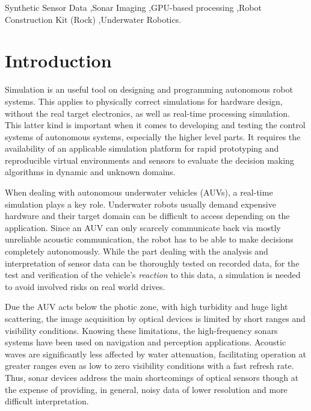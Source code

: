 \documentclass[final,5p,times]{elsarticle}
\begin{document}
\begin{frontmatter}
\begin{abstract}
\end{abstract}

\begin{keyword}
Synthetic Sensor Data \sep Sonar Imaging  \sep GPU-based processing \sep Robot Construction Kit (Rock) \sep Underwater Robotics.

\end{keyword}

\end{frontmatter}

\linenumbers

\section{Introduction}
\label{introduction}

Simulation is an useful tool on designing and programming autonomous robot systems. This applies to physically correct simulations for hardware design, without the real target electronics, as well as real-time processing simulation. This latter kind is important when it comes to developing and testing the control systems of autonomous systems, especially the higher level parts. It requires the availability of an applicable simulation platform for rapid prototyping and reproducible virtual environments and sensors to evaluate the decision making algorithms in dynamic and unknown domains.

When dealing with autonomous underwater vehicles (AUVs), a real-time simulation plays a key role. Underwater robots usually demand expensive hardware and their target domain can be difficult to access depending on the application. Since an AUV can only scarcely communicate back via mostly unreliable acoustic communication, the robot has to be able to make decisions completely autonomously. While the part dealing with the analysis and interpretation of sensor data can be thoroughly tested on recorded data, for the test and verification of the vehicle's \emph{reaction} to this data, a simulation is needed to avoid involved risks on real world drives.

Due the AUV acts below the photic zone, with high turbidity and huge light scattering, the image acquisition by optical devices is limited by short ranges and visibility conditions. Knowing these limitations, the high-frequency sonars systems have been used on navigation and perception applications. Acoustic waves are significantly less affected by water attenuation, facilitating operation at greater ranges even as low to zero visibility conditions with a fast refresh rate. Thus, sonar devices address the main shortcomings of optical sensors though at the expense of providing, in general, noisy data of lower resolution and more difficult interpretation.
\end{document}
